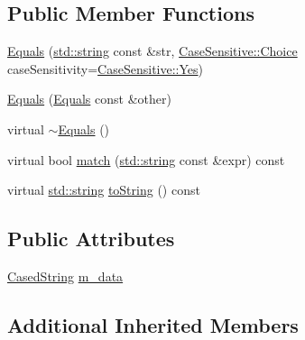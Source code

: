 \subsection*{Public Member Functions}
\begin{DoxyCompactItemize}
\item 
\hyperlink{struct_catch_1_1_matchers_1_1_impl_1_1_std_string_1_1_equals_a5921d5ed75320fb64a678e3f1292a464}{Equals} (\hyperlink{_s_d_l__opengl__glext_8h_ae84541b4f3d8e1ea24ec0f466a8c568b}{std\+::string} const \&str, \hyperlink{struct_catch_1_1_case_sensitive_aad49d3aee2d97066642fffa919685c6a}{Case\+Sensitive\+::\+Choice} case\+Sensitivity=\hyperlink{struct_catch_1_1_case_sensitive_aad49d3aee2d97066642fffa919685c6aa7c5550b69ec3c502e6f609b67f9613c6}{Case\+Sensitive\+::\+Yes})
\item 
\hyperlink{struct_catch_1_1_matchers_1_1_impl_1_1_std_string_1_1_equals_acaa97de06aedf363ae803d65a975f5e4}{Equals} (\hyperlink{struct_catch_1_1_matchers_1_1_impl_1_1_std_string_1_1_equals}{Equals} const \&other)
\item 
virtual \hyperlink{struct_catch_1_1_matchers_1_1_impl_1_1_std_string_1_1_equals_ad34af04f636ec84d7c613ead32f20c3f}{$\sim$\+Equals} ()
\item 
virtual bool \hyperlink{struct_catch_1_1_matchers_1_1_impl_1_1_std_string_1_1_equals_a00c8259a76c24da669e116662ededc70}{match} (\hyperlink{_s_d_l__opengl__glext_8h_ae84541b4f3d8e1ea24ec0f466a8c568b}{std\+::string} const \&expr) const 
\item 
virtual \hyperlink{_s_d_l__opengl__glext_8h_ae84541b4f3d8e1ea24ec0f466a8c568b}{std\+::string} \hyperlink{struct_catch_1_1_matchers_1_1_impl_1_1_std_string_1_1_equals_a7a09449ff2f858981caf3b1f6c36d270}{to\+String} () const 
\end{DoxyCompactItemize}
\subsection*{Public Attributes}
\begin{DoxyCompactItemize}
\item 
\hyperlink{struct_catch_1_1_matchers_1_1_impl_1_1_std_string_1_1_cased_string}{Cased\+String} \hyperlink{struct_catch_1_1_matchers_1_1_impl_1_1_std_string_1_1_equals_ae09964b7ba291ce574b514a2ee3eddb0}{m\+\_\+data}
\end{DoxyCompactItemize}
\subsection*{Additional Inherited Members}


